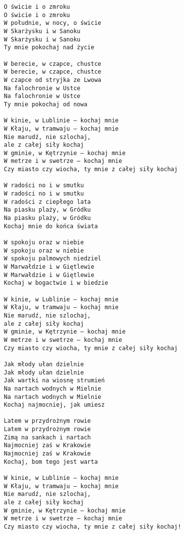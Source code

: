 \documentclass[12pt]{article}
\begin{document}
\begin{verbatim}
O świcie i o zmroku
O świcie i o zmroku
W południe, w nocy, o świcie
W Skarżysku i w Sanoku
W Skarżysku i w Sanoku
Ty mnie pokochaj nad życie

W berecie, w czapce, chustce
W berecie, w czapce, chustce
W czapce od stryjka ze Lwowa
Na falochronie w Ustce
Na falochronie w Ustce
Ty mnie pokochaj od nowa

W kinie, w Lublinie – kochaj mnie
W Kłaju, w tramwaju – kochaj mnie
Nie marudź, nie szlochaj,
ale z całej siły kochaj
W gminie, w Kętrzynie – kochaj mnie
W metrze i w swetrze – kochaj mnie
Czy miasto czy wiocha, ty mnie z całej siły kochaj

W radości no i w smutku
W radości no i w smutku
W radości z ciepłego lata
Na piasku plaży, w Gródku
Na piasku plaży, w Gródku
Kochaj mnie do końca świata

W spokoju oraz w niebie
W spokoju oraz w niebie
W spokoju palmowych niedziel
W Marwałdzie i w Giętlewie
W Marwałdzie i w Giętlewie
Kochaj w bogactwie i w biedzie

W kinie, w Lublinie – kochaj mnie
W Kłaju, w tramwaju – kochaj mnie
Nie marudź, nie szlochaj,
ale z całej siły kochaj
W gminie, w Kętrzynie – kochaj mnie
W metrze i w swetrze – kochaj mnie
Czy miasto czy wiocha, ty mnie z całej siły kochaj

Jak młody ułan dzielnie
Jak młody ułan dzielnie
Jak wartki na wiosnę strumień
Na nartach wodnych w Mielnie
Na nartach wodnych w Mielnie
Kochaj najmocniej, jak umiesz

Latem w przydrożnym rowie
Latem w przydrożnym rowie
Zimą na sankach i nartach
Najmocniej zaś w Krakowie
Najmocniej zaś w Krakowie
Kochaj, bom tego jest warta

W kinie, w Lublinie – kochaj mnie
W Kłaju, w tramwaju – kochaj mnie
Nie marudź, nie szlochaj,
ale z całej siły kochaj
W gminie, w Kętrzynie – kochaj mnie
W metrze i w swetrze – kochaj mnie
Czy miasto czy wiocha, ty mnie z całej siły kochaj!
\end{verbatim}
\clearpage
\end{document}
